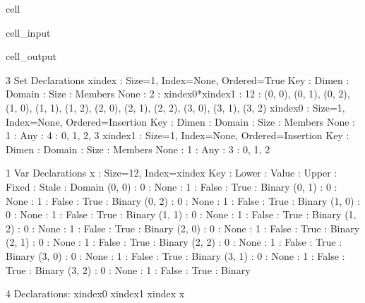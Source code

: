 \documentclass[letterpaper,10pt,english]{jupyterBook}
\begin{document}
\begin{sphinxuseclass}{cell}\begin{sphinxVerbatimInput}

\begin{sphinxuseclass}{cell_input}
\begin{sphinxVerbatim}[commandchars=\\\{\}]
  
      
\end{sphinxVerbatim}

\end{sphinxuseclass}\end{sphinxVerbatimInput}
\begin{sphinxVerbatimOutput}

\begin{sphinxuseclass}{cell_output}
\begin{sphinxVerbatim}[commandchars=\\\{\}]
3 Set Declarations
    x\PYGZus{}index : Size=1, Index=None, Ordered=True
        Key  : Dimen : Domain              : Size : Members
        None :     2 : x\PYGZus{}index\PYGZus{}0*x\PYGZus{}index\PYGZus{}1 :   12 : \PYGZob{}(0, 0), (0, 1), (0, 2), (1, 0), (1, 1), (1, 2), (2, 0), (2, 1), (2, 2), (3, 0), (3, 1), (3, 2)\PYGZcb{}
    x\PYGZus{}index\PYGZus{}0 : Size=1, Index=None, Ordered=Insertion
        Key  : Dimen : Domain : Size : Members
        None :     1 :    Any :    4 : \PYGZob{}0, 1, 2, 3\PYGZcb{}
    x\PYGZus{}index\PYGZus{}1 : Size=1, Index=None, Ordered=Insertion
        Key  : Dimen : Domain : Size : Members
        None :     1 :    Any :    3 : \PYGZob{}0, 1, 2\PYGZcb{}

1 Var Declarations
    x : Size=12, Index=x\PYGZus{}index
        Key    : Lower : Value : Upper : Fixed : Stale : Domain
        (0, 0) :     0 :  None :     1 : False :  True : Binary
        (0, 1) :     0 :  None :     1 : False :  True : Binary
        (0, 2) :     0 :  None :     1 : False :  True : Binary
        (1, 0) :     0 :  None :     1 : False :  True : Binary
        (1, 1) :     0 :  None :     1 : False :  True : Binary
        (1, 2) :     0 :  None :     1 : False :  True : Binary
        (2, 0) :     0 :  None :     1 : False :  True : Binary
        (2, 1) :     0 :  None :     1 : False :  True : Binary
        (2, 2) :     0 :  None :     1 : False :  True : Binary
        (3, 0) :     0 :  None :     1 : False :  True : Binary
        (3, 1) :     0 :  None :     1 : False :  True : Binary
        (3, 2) :     0 :  None :     1 : False :  True : Binary

4 Declarations: x\PYGZus{}index\PYGZus{}0 x\PYGZus{}index\PYGZus{}1 x\PYGZus{}index x
\end{sphinxVerbatim}

\end{sphinxuseclass}\end{sphinxVerbatimOutput}

\end{sphinxuseclass}
\end{document}
